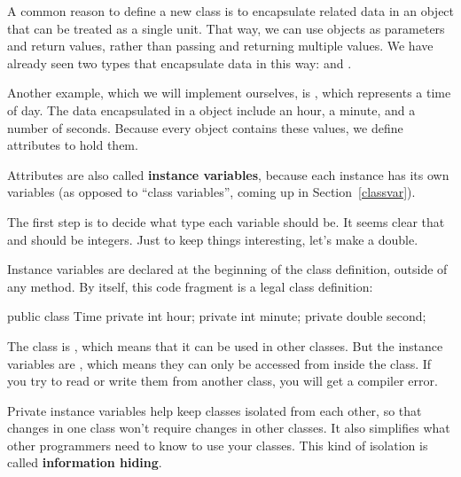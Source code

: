 
A common reason to define a new class is to encapsulate related data in an object that can be treated as a single unit.
That way, we can use objects as parameters and return values, rather than passing and returning multiple values.
We have already seen two types that encapsulate data in this way:  and .


Another example, which we will implement ourselves, is , which represents a time of day.
The data encapsulated in a  object include an hour, a minute, and a number of seconds.
Because every  object contains these values, we define attributes to hold them.


Attributes are also called {\bf instance variables}, because each instance has its own variables (as opposed to ``class variables'', coming up in Section~\ref{classvar}).

The first step is to decide what type each variable should be.
It seems clear that  and  should be integers.
Just to keep things interesting, let's make  a double.

Instance variables are declared at the beginning of the class definition, outside of any method.
By itself, this code fragment is a legal class definition:

\begin{code}
public class Time {
    private int hour;
    private int minute;
    private double second;
}
\end{code}


The  class is , which means that it can be used in other classes.
But the instance variables are , which means they can only be accessed from inside the  class.
If you try to read or write them from another class, you will get a compiler error.


Private instance variables help keep classes isolated from each other, so that changes in one class won't require changes in other classes.
It also simplifies what other programmers need to know to use your classes.
This kind of isolation is called {\bf information hiding}.


